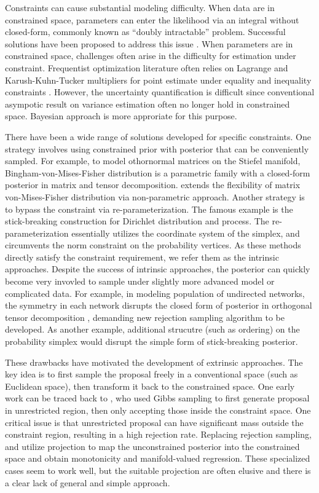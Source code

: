 \documentclass[10pt]{article}
\begin{document}
Constraints can cause substantial modeling difficulty. When data are in constrained space, parameters can enter the likelihood via an integral without closed-form, commonly known as ``doubly intractable'' problem. Successful solutions have been proposed to address this issue \citep{murray2012mcmc,rao2016data}. When parameters are in  constrained space, challenges often arise in the difficulty for estimation under constraint. Frequentist optimization literature often relies on Lagrange and Karush-Kuhn-Tucker multipliers for point estimate under equality and inequality constraints \citep{boyd2004convex}. However, the uncertainty quantification is difficult since conventional asympotic result on variance estimation often no longer hold in constrained space. Bayesian approach is more approriate for this purpose.

There have been a wide range of solutions developed for specific constraints. One strategy involves using constrained prior with posterior that can be conveniently sampled. For example, to model othornormal matrices on the Stiefel manifold, Bingham-von-Mises-Fisher distribution \citep{khatri1977mises,hoff2009simulation} is a parametric family with a closed-form posterior in matrix and tensor decomposition. \cite{lin2016bayesstiefel} extends the flexibility of matrix von-Mises-Fisher distribution via non-parametric approach. Another strategy is to bypass the constraint via re-parameterization. The famous example is the stick-breaking construction for Dirichlet distribution and process. The re-parameterization essentially utilizes the coordinate system of the simplex, and circumvents the norm constraint on the probability vertices. As these methods directly satisfy the constraint requirement, we refer them as the intrinsic approaches. Despite the success of intrinsic approaches, the posterior can quickly become very invovled to sample under slightly more advanced model or complicated data. For example, in modeling population of undirected networks, the symmetry in each network disrupts the closed form of posterior in orthogonal tensor decomposition \citep{hoff2016equivariant}, demanding new rejection sampling algorithm to be developed. As another example, additional strucutre (such as ordering) on the probability simplex would disrupt the simple form of stick-breaking posterior.

These drawbacks have motivated the development of extrinsic approaches. The key idea is to first sample the proposal freely in a conventional space (such as Euclidean space), then transform it back to the constrained space. One early work can be traced back to \cite{gelfand1992bayesian}, who used Gibbs sampling to first generate proposal in unrestricted region, then only accepting those inside the constraint space. One critical issue is that unrestricted proposal can have significant mass outside the constraint region, resulting in a high rejection rate. Replacing rejection sampling, \cite{lin2014monogp} and \cite{lin2016extrinsic} utilize projection to map the unconstrained posterior into the constrained space and obtain monotonicity and manifold-valued regression. These specialized cases seem to work well, but the suitable projection are often elusive and there is a clear lack of general and simple approach.
\end{document}
